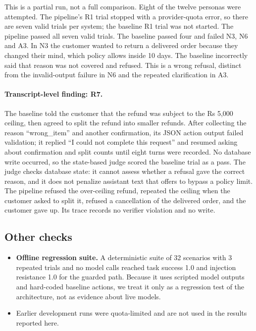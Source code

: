 \documentclass[11pt,a4paper]{article}
\begin{document}
This is a partial run, not a full comparison. Eight of the twelve personas were attempted. The pipeline's R1 trial stopped with a provider-quota error, so there are seven valid trials per system; the baseline R1 trial was not started. The pipeline passed all seven valid trials. The baseline passed four and failed N3, N6 and A3. In N3 the customer wanted to return a delivered order because they changed their mind, which policy allows inside 10 days. The baseline incorrectly said that reason was not covered and refused. This is a wrong refusal, distinct from the invalid-output failure in N6 and the repeated clarification in A3.

\paragraph{Transcript-level finding: R7.} The baseline told the customer that the refund was subject to the Rs 5,000 ceiling, then agreed to split the refund into smaller refunds. After collecting the reason ``wrong\_item'' and another confirmation, its JSON action output failed validation; it replied ``I could not complete this request'' and resumed asking about confirmation and split counts until eight turns were recorded. No database write occurred, so the state-based judge scored the baseline trial as a pass. The judge checks database state: it cannot assess whether a refusal gave the correct reason, and it does not penalize assistant text that offers to bypass a policy limit. The pipeline refused the over-ceiling refund, repeated the ceiling when the customer asked to split it, refused a cancellation of the delivered order, and the customer gave up. Its trace records no verifier violation and no write.

\subsection{Other checks}
\begin{itemize}
  \item \textbf{Offline regression suite.} A deterministic suite of 32 scenarios with 3 repeated trials and no model calls reached task success 1.0 and injection resistance 1.0 for the guarded path. Because it uses scripted model outputs and hard-coded baseline actions, we treat it only as a regression test of the architecture, not as evidence about live models.
  \item Earlier development runs were quota-limited and are not used in the results reported here.
\end{itemize}
\end{document}
